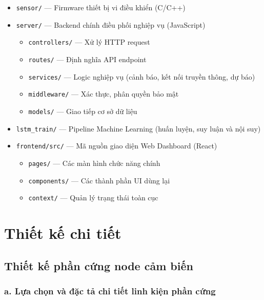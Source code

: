 \begin{itemize}[leftmargin=2cm]
  \item \texttt{sensor/} --- Firmware thiết bị vi điều khiển (C/C++)
  \item \texttt{server/} --- Backend chính điều phối nghiệp vụ (JavaScript)
    \begin{itemize}
      \item \texttt{controllers/} --- Xử lý HTTP request
      \item \texttt{routes/} --- Định nghĩa API endpoint
      \item \texttt{services/} --- Logic nghiệp vụ (cảnh báo, kết nối truyền thông, dự báo)
      \item \texttt{middleware/} --- Xác thực, phân quyền bảo mật
      \item \texttt{models/} --- Giao tiếp cơ sở dữ liệu
    \end{itemize}
  \item \texttt{lstm\_train/} --- Pipeline Machine Learning (huấn luyện, suy luận và nội suy)
  \item \texttt{frontend/src/} --- Mã nguồn giao diện Web Dashboard (React)
    \begin{itemize}
      \item \texttt{pages/} --- Các màn hình chức năng chính
      \item \texttt{components/} --- Các thành phần UI dùng lại
      \item \texttt{context/} --- Quản lý trạng thái toàn cục
    \end{itemize}
\end{itemize}

\section{Thiết kế chi tiết}
\label{sec:design:detail}

\subsection{Thiết kế phần cứng node cảm biến}
\label{subsec:design:hardware}

\subsubsection*{a. Lựa chọn và đặc tả chi tiết linh kiện phần cứng}

